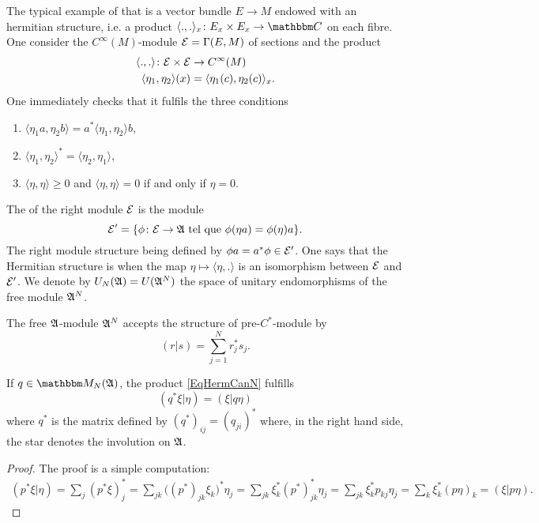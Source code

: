 The typical example of that is a vector bundle $E\to M$ endowed with an hermitian structure, i.e. a product $\langle ., .\rangle_x\colon E_x\times E_x\to \eC$ on each fibre. One consider the $ C^{\infty}(M)$-module $\mathcal{E}=\Gamma(E,M)$ of sections and the product
\begin{equation}
\begin{aligned}
 \langle ., .\rangle\colon \mathcal{E}\times\mathcal{E}&\to C^{\infty}(M)  \\ 
   \langle \eta_1, \eta_2\rangle (x)&= \langle \eta_1(c), \eta_2(c)\rangle_x. 
\end{aligned}
\end{equation}
One immediately checks that it fulfils the three conditions 
\begin{enumerate}
\item $\langle \eta_1a, \eta_2b\rangle= a^*\langle \eta_1, \eta_2\rangle b$,
\item $\langle \eta_1, \eta_2\rangle^*=\langle \eta_2, \eta_1\rangle $,
\item $\langle \eta, \eta\rangle \geq 0$ and $\langle \eta, \eta\rangle =0$ if and only if $\eta=0$.
\end{enumerate}

The  of the right module $\mathcal{E}$ is the module
\[ 
  \mathcal{E}'=\{ \phi\colon \mathcal{E}\to \mathfrak{A}\text{ tel que } \phi(\eta a)=\phi(\eta)a \}.
\]
The right module structure being defined by $\phi a=a^*\phi\in\mathcal{E}'$. One says that the Hermitian structure is  when the map $\eta\mapsto\langle \eta, .\rangle $ is an isomorphism between $\mathcal{E}$ and $\mathcal{E}'$. We denote by $U_N(\mathfrak{A})=U(\mathfrak{A}^N)$ the space of unitary endomorphisms of the free module $\mathfrak{A}^N$.

The free $\mathfrak{A}$-module $\mathfrak{A}^N$ accepts the structure of pre-$C^*$-module by
\begin{equation}	\label{EqHermCanN}
(r|s) = \sum_{j=1}^N r^*_js_j.
\end{equation}

\begin{lemma}		\label{Lemqqstarherm}
If $q\in\eM_N(\cA)$, the product \eqref{EqHermCanN} fulfills 
\[ 
 (q^*\xi|\eta)=(\xi|q\eta)
\]
where $q^*$ is the matrix defined by $(q^*)_{ij}=(q_{ji})^*$ where, in the right hand side, the star denotes the involution on $\mathfrak{A}$.
\end{lemma}

\begin{proof}
The proof is a simple computation:
\begin{align*}
(p^*\xi|\eta)	=\sum_j(p^*\xi)_j^*
		=\sum_{jk}\big( (p^*)_{jk}\xi_k \big)^*\eta_j
		=\sum_{jk}\xi_k^*(p^*)_{jk}^*\eta_j
		=\sum_{jk}\xi^*_k p_{kj}\eta_j
		=\sum_k\xi_k^*(p\eta)_k
		=(\xi|p\eta).
\end{align*}
\end{proof}

